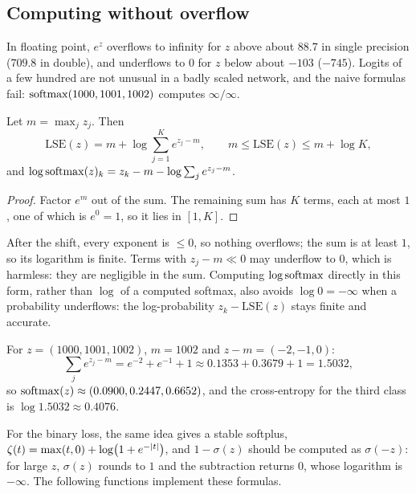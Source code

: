\begin{notechapter}
\section{Computing without overflow}\label{sigmoid-softmax:sec:numerics}

In floating point, $e^{z}$ overflows to infinity for $z$ above about $88.7$ in single
precision ($709.8$ in double), and underflows to $0$ for $z$ below about $-103$ ($-745$).
Logits of a few hundred are not unusual in a badly scaled network, and the naive
formulas fail: $\operatorname{softmax}(1000, 1001, 1002)$ computes $\infty/\infty$.

\begin{proposition}\label{sigmoid-softmax:prop:lse}
Let $m = \max_jz_j$. Then
\[
  \mathrm{LSE}(z) = m + \log\sum_{j=1}^Ke^{z_j - m},\qquad
  m\leq\mathrm{LSE}(z)\leq m + \log K,
\]
and $\log\operatorname{softmax}(z)_k = z_k - m - \log\sum_je^{z_j - m}$.
\end{proposition}

\begin{proof}
Factor $e^m$ out of the sum. The remaining sum has $K$ terms, each at most $1$, one of
which is $e^0 = 1$, so it lies in $[1, K]$.
\end{proof}

After the shift, every exponent is $\leq0$, so nothing overflows; the sum is at least
$1$, so its logarithm is finite. Terms with $z_j - m\ll0$ may underflow to $0$, which is
harmless: they are negligible in the sum. Computing $\log\operatorname{softmax}$ directly in this
form, rather than $\log$ of a computed softmax, also avoids $\log0 = -\infty$ when a
probability underflows: the log-probability $z_k - \mathrm{LSE}(z)$ stays finite and accurate.

\begin{example}\label{sigmoid-softmax:ex:large}
For $z = (1000, 1001, 1002)$, $m = 1002$ and $z - m = (-2, -1, 0)$:
\[
  \sum_je^{z_j - m} = e^{-2} + e^{-1} + 1\approx0.1353 + 0.3679 + 1 = 1.5032,
\]
so $\operatorname{softmax}(z)\approx(0.0900, 0.2447, 0.6652)$, and the cross-entropy for the third class is
$\log1.5032\approx0.4076$.
\end{example}

For the binary loss, the same idea gives a stable softplus,
$\zeta(t) = \max(t, 0) + \log\bigl(1 + e^{-\left|t\right|}\bigr)$, and $1 - \sigma(z)$ should be computed as $\sigma(-z)$: for
large $z$, $\sigma(z)$ rounds to $1$ and the subtraction returns $0$, whose logarithm is
$-\infty$. The following functions implement these formulas.


\end{notechapter}
